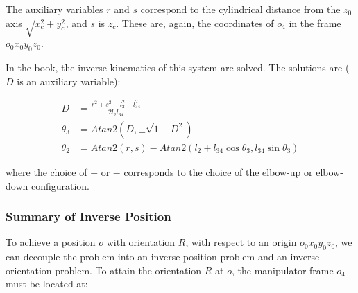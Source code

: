 \documentclass{article}
\begin{document}


The auxiliary variables $r$ and $s$ correspond to the cylindrical distance
	from the $z_0$ axis $\sqrt{x_c^2 + y_c^2}$, and $s$ is $z_c$.
These are, again, the coordinates of $o_4$ in the frame $o_0 x_0 y_0 z_0$.

In the book, the inverse kinematics of this system are solved.
The solutions are ($D$ is an auxiliary variable):

\begin{align*}
D & = \frac{r^2 + s^2 - l_2^2 - l_{34}^2}{2 l_2 l_{34}} \\
\theta_3 & = Atan2(D, \pm \sqrt{1 - D^2}) \\
\theta_2 & = Atan2(r, s) - Atan2(l_2 + l_{34} \cos \theta_3, l_{34} \sin \theta_3)
\end{align*}

where the choice of $+$ or $-$ corresponds to the choice of the elbow-up
	or elbow-down configuration.

\subsubsection{Summary of Inverse Position}

To achieve a position $o$ with orientation $R$, with respect to an origin
	$o_0 x_0 y_0 z_0$, we can decouple the problem into an inverse position
	problem and an inverse orientation problem.
To attain the orientation $R$ at $o$, the manipulator frame $o_4$
	must be located at:
\end{document}
